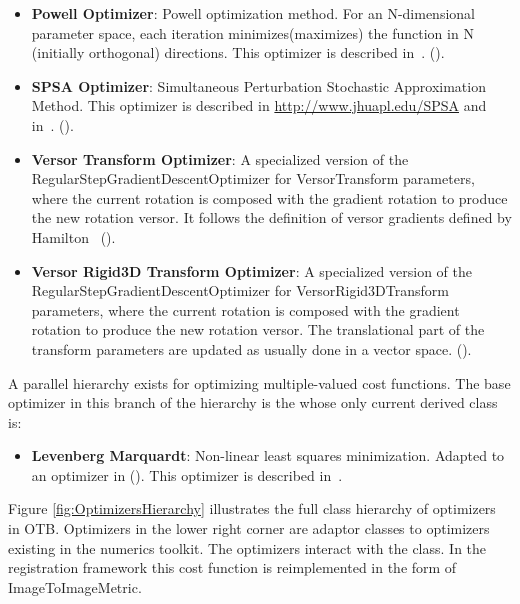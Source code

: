 \begin{itemize}
\item \textbf{Powell Optimizer}: Powell optimization method.  For an
N-dimensional parameter space, each iteration minimizes(maximizes) the function
in N (initially orthogonal) directions. This optimizer is described
in~\cite{Press1992}.  ().

\item \textbf{SPSA Optimizer}: Simultaneous Perturbation Stochastic
Approximation Method. This optimizer is described in
\url{http://www.jhuapl.edu/SPSA} and in~\cite{Spall1998}.
(). 

\item \textbf{Versor Transform Optimizer}: A specialized version of the 
RegularStepGradientDescentOptimizer for VersorTransform
parameters, where the current rotation is composed with the gradient rotation
to produce the new rotation versor. It follows the definition of versor
gradients defined by Hamilton~\cite{Hamilton1866}
().

\item \textbf{Versor Rigid3D Transform Optimizer}: A specialized version of the
RegularStepGradientDescentOptimizer for VersorRigid3DTransform parameters,
where the current rotation is composed with the gradient rotation to produce
the new rotation versor. The translational part of the transform parameters are
updated as usually done in a vector space.
().


\end{itemize}

A parallel hierarchy exists for optimizing multiple-valued cost functions. The
base optimizer in this branch of the hierarchy is the
 whose only current derived class
is:

\begin{itemize}

\item \textbf{Levenberg Marquardt}: Non-linear least squares minimization.
Adapted to an optimizer in  ().
This optimizer is described in~\cite{Press1992}.

\end{itemize}


Figure \ref{fig:OptimizersHierarchy} illustrates the full class hierarchy of
optimizers in OTB. Optimizers in the lower right corner are adaptor classes
to optimizers existing in the  numerics toolkit. The optimizers
interact with the  class. In the registration framework
this cost function is reimplemented in the form of ImageToImageMetric.





